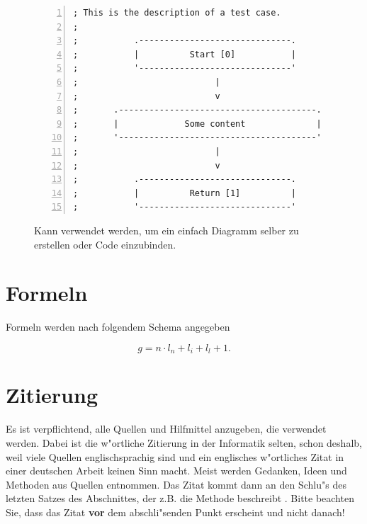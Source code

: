 \FloatBarrier
\begin{figure}[htb]
\begin{lstlisting}[backgroundcolor={\color{white}},
basicstyle={\normalsize\sffamily},
breaklines=true,
frame={bottomline,topline, rightline},
language=HTML,
numbers=left,
showstringspaces=false,
xleftmargin=22pt]	
; This is the description of a test case.
;
;           .------------------------------.
;           |          Start [0]           |
;           '------------------------------'
;                           |
;                           v
;       .---------------------------------------.
;       |             Some content		        |
;       '---------------------------------------'
;                           |
;                           v
;           .------------------------------.
;           |          Return [1]          |
;           '------------------------------'
\end{lstlisting}
  \caption[Ein Listing, welches zusätzliche die Zeilen anzeigt.]{Kann verwendet werden, um ein einfach Diagramm selber zu erstellen oder Code einzubinden.}
\label{lst:Diagramm}
\end{figure}

\section{Formeln}
\label{sec:Formeln}

Formeln werden nach folgendem Schema angegeben

\begin{equation}
g = n\cdot l_n + l_i + l_l + 1.
\label{gle:Laenge}
\end{equation}


\section{Zitierung}\label{zitierung}

Es ist verpflichtend, alle Quellen und Hilfmittel anzugeben, die verwendet werden.
Dabei ist die w"ortliche Zitierung in der Informatik selten, schon deshalb, weil viele Quellen englischsprachig sind und ein englisches w"ortliches Zitat in einer deutschen Arbeit keinen Sinn macht.
Meist werden Gedanken, Ideen und Methoden aus Quellen entnommen.
Das Zitat kommt dann an den Schlu"s des letzten Satzes des Abschnittes, der z.B. die Methode beschreibt \cite{wissentschaftlichesArbeitMitLatex}.
Bitte beachten Sie, dass das Zitat \textbf{vor} dem abschli"senden Punkt erscheint und nicht danach!

